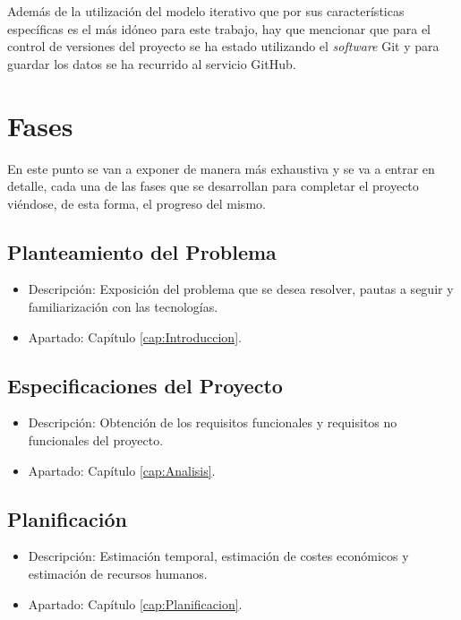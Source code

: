 Además de la utilización del modelo iterativo que por sus características específicas es el más idóneo para este trabajo, hay que mencionar que para el control de versiones del proyecto se ha estado utilizando el \textit{software} Git y para guardar los datos se ha recurrido al servicio GitHub.

\section{Fases}
En este punto se van a exponer de manera más exhaustiva y se va a entrar en detalle, cada una de las fases que se desarrollan para completar el proyecto viéndose, de esta forma, el progreso del mismo.

\subsection{Planteamiento del Problema}
\begin{itemize}
  \item Descripción: Exposición del problema que se desea resolver, pautas a seguir y familiarización con las tecnologías.
  \item Apartado: Capítulo \ref{cap:Introduccion}.\\
\end{itemize}

\subsection{Especificaciones del Proyecto}
\begin{itemize}
  \item Descripción: Obtención de los requisitos funcionales y requisitos no funcionales del proyecto.
  \item Apartado: Capítulo \ref{cap:Analisis}.\\
\end{itemize}

\subsection{Planificación}
\begin{itemize}
  \item Descripción: Estimación temporal, estimación de costes económicos y estimación de recursos humanos.
  \item Apartado: Capítulo \ref{cap:Planificacion}.\\
\end{itemize}

